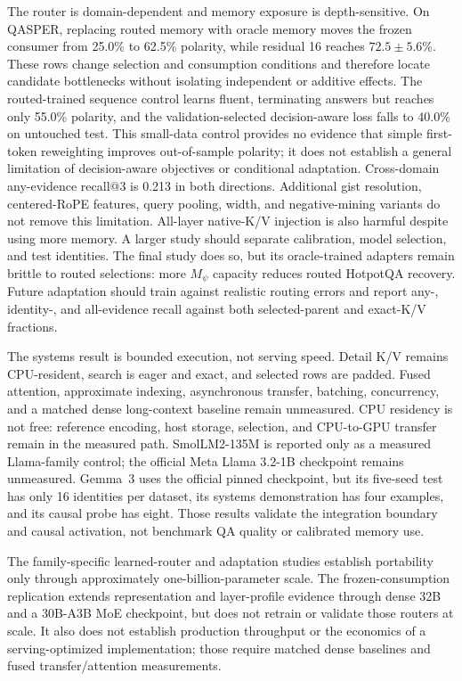 \documentclass[11pt]{article}
\begin{document}
The router is domain-dependent and memory exposure is depth-sensitive. On QASPER, replacing routed
memory with oracle memory moves the frozen consumer from 25.0\% to 62.5\% polarity, while residual
16 reaches $72.5\pm5.6$\%. These rows change selection and consumption conditions and therefore
locate candidate bottlenecks without isolating independent or additive effects. The routed-trained
sequence control learns fluent, terminating answers but reaches only 55.0\% polarity, and the
validation-selected decision-aware loss falls to 40.0\% on untouched test. This small-data control
provides no evidence that simple first-token reweighting improves out-of-sample polarity; it does
not establish a general limitation of decision-aware objectives or conditional adaptation.
Cross-domain any-evidence
recall@3 is 0.213 in both directions. Additional gist resolution, centered-RoPE features, query
pooling, width, and negative-mining variants do not remove this limitation. All-layer native-K/V
injection is also harmful despite using more memory. A larger study should separate calibration,
model selection, and test identities. The final study does so, but its oracle-trained adapters
remain brittle to routed selections: more $M_\psi$ capacity reduces routed HotpotQA recovery.
Future adaptation should train against realistic routing errors and report any-, identity-, and
all-evidence recall against both selected-parent and exact-K/V fractions.

The systems result is bounded execution, not serving speed. Detail K/V remains CPU-resident,
search is eager and exact, and selected rows are padded. Fused attention, approximate indexing,
asynchronous transfer, batching, concurrency, and a matched dense long-context baseline remain
unmeasured. CPU residency is not free: reference encoding, host storage, selection, and
CPU-to-GPU transfer remain in the measured path. SmolLM2-135M is reported only as a measured
Llama-family control; the official Meta Llama 3.2-1B checkpoint remains unmeasured. Gemma~3 uses the official pinned
checkpoint, but its five-seed test has only 16 identities per dataset, its systems demonstration has
four examples, and its causal probe has eight. Those results validate the integration boundary and
causal activation, not benchmark QA quality or calibrated memory use.

The family-specific learned-router and adaptation studies establish portability only through
approximately one-billion-parameter scale. The frozen-consumption replication extends
representation and layer-profile evidence through dense 32B and a 30B-A3B MoE checkpoint, but
does not retrain or validate those routers at scale. It also does not establish production
throughput or the economics of a serving-optimized implementation; those require matched dense
baselines and fused transfer/attention measurements.
\end{document}
